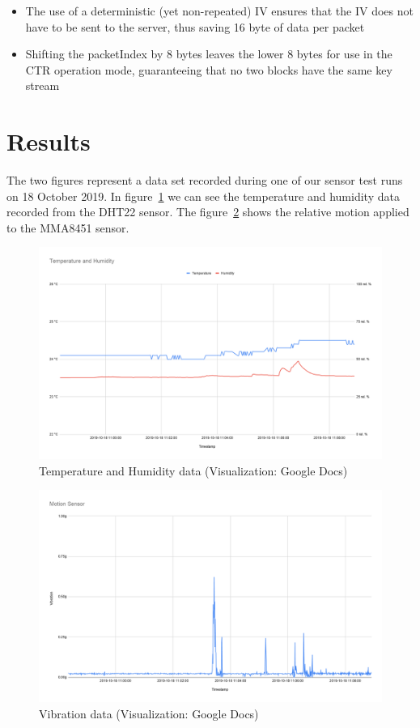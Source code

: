 \documentclass[a4paper,11pt]{scrartcl}
\begin{document}
\begin{itemize}
\item The use of a deterministic (yet non-repeated) IV ensures that the IV does not have to be sent to the server, thus saving 16 byte of data per packet
\item Shifting the packetIndex by 8 bytes leaves the lower 8 bytes for use in the CTR operation mode, guaranteeing that no two blocks have the same key stream
\end{itemize}

\part{Results}
The two figures represent a data set recorded during one of our sensor test runs on 18 October 2019. In figure~\ref{fig:sensor1} we can see the temperature and humidity data recorded from the DHT22 sensor. The figure~\ref{fig:sensor2} shows the relative motion applied to the MMA8451 sensor.

\begin{figure}
    \centering
    \includegraphics[width=14cm]{sensor1}
    \caption{Temperature and Humidity data (Visualization: Google Docs)}
    \label{fig:sensor1}
\end{figure}

\begin{figure}
    \centering
    \includegraphics[width=14cm]{sensor2}
    \caption{Vibration data (Visualization: Google Docs)}
    \label{fig:sensor2}
\end{figure}
\end{document}
